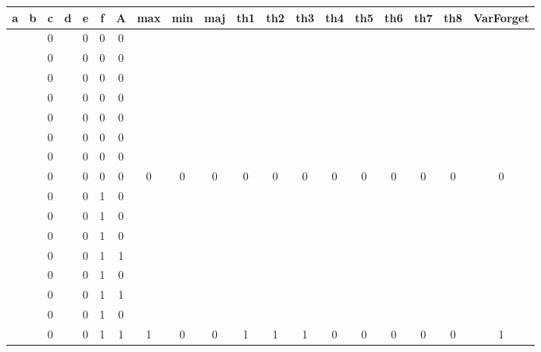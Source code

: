 \begin{table}[!tb]
    \centering
    \begin{tabular}{|c|c|c|c|c|c|c|c|c|c|c|c|c|c|c|c|c|c|c|}
        \hline
        \textbf{a} & \textbf{b} & \textbf{c} & \textbf{d} & \textbf{e} & \textbf{f} & \textbf{A} & \textbf{max} & \textbf{min} & \textbf{maj} & \textbf{th1} & \textbf{th2} & \textbf{th3} & \textbf{th4} & \textbf{th5} & \textbf{th6} & \textbf{th7} & \textbf{th8} & \textbf{VarForget} \\ \hline
        \rowcolor{gray!40}  &  & 0 &  & 0 & 0 & 0 &  &  &  &  &  &  &  &  &  &  &  &  \\ \hline
        \rowcolor{gray!40}  &  & 0 &  & 0 & 0 & 0 &  &  &  &  &  &  &  &  &  &  &  &  \\ \hline
        \rowcolor{gray!40}  &  & 0 &  & 0 & 0 & 0 &  &  &  &  &  &  &  &  &  &  &  &  \\ \hline
        \rowcolor{gray!40}  &  & 0 &  & 0 & 0 & 0 &  &  &  &  &  &  &  &  &  &  &  &  \\ \hline
        \rowcolor{gray!40}  &  & 0 &  & 0 & 0 & 0 &  &  &  &  &  &  &  &  &  &  &  &  \\ \hline
        \rowcolor{gray!40}  &  & 0 &  & 0 & 0 & 0 &  &  &  &  &  &  &  &  &  &  &  &  \\ \hline
        \rowcolor{gray!40}  &  & 0 &  & 0 & 0 & 0 &  &  &  &  &  &  &  &  &  &  &  &  \\ \hline
        \rowcolor{gray!40}  &  & 0 &  & 0 & 0 & 0 & 0 & 0 & 0 & 0 & 0 & 0 & 0 & 0 & 0 & 0 & 0 & 0 \\ \hline
        \rowcolor{blue!40}  &  & 0 &  & 0 & 1 & 0 &  &  &  &  &  &  &  &  &  &  &  &  \\ \hline
        \rowcolor{blue!40}  &  & 0 &  & 0 & 1 & 0 &  &  &  &  &  &  &  &  &  &  &  &  \\ \hline
        \rowcolor{blue!40}  &  & 0 &  & 0 & 1 & 0 &  &  &  &  &  &  &  &  &  &  &  &  \\ \hline
        \rowcolor{blue!40}  &  & 0 &  & 0 & 1 & 1 &  &  &  &  &  &  &  &  &  &  &  &  \\ \hline
        \rowcolor{blue!40}  &  & 0 &  & 0 & 1 & 0 &  &  &  &  &  &  &  &  &  &  &  &  \\ \hline
        \rowcolor{blue!40}  &  & 0 &  & 0 & 1 & 1 &  &  &  &  &  &  &  &  &  &  &  &  \\ \hline
        \rowcolor{blue!40}  &  & 0 &  & 0 & 1 & 0 &  &  &  &  &  &  &  &  &  &  &  &  \\ \hline
        \rowcolor{blue!40}  &  & 0 &  & 0 & 1 & 1 & 1 & 0 & 0 & 1 & 1 & 1 & 0 & 0 & 0 & 0 & 0 & 1 \\ \hline

\end{tabular}
\end{table}
